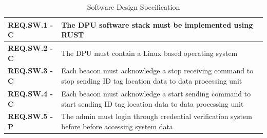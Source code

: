 \medskip
\bgroup
\def\arraystretch{1.5}
\begin{table}[H]
\centering
\begin{tabular}{ | m{3cm} | m{12.5cm} |}
\hline
\textbf{REQ.SW.1 - C} &  The DPU software stack must be implemented using RUST  \\
\hline
\textbf{REQ.SW.2 - C} &  The DPU must contain a Linux based operating system  \\
\hline
\textbf{REQ.SW.3 - C} &  Each beacon must acknowledge a stop receiving command to stop sending ID tag location data to data processing unit \\
\hline
\textbf{REQ.SW.4 - C} &  Each beacon must acknowledge a start sending command to start sending ID tag location data to data processing unit  \\
\hline
\textbf{REQ.SW.5 - P} &  The admin must login through credential verification system before before accessing system data \\
\hline
\end{tabular}
\caption{Software Design Specification}
\end{table}

